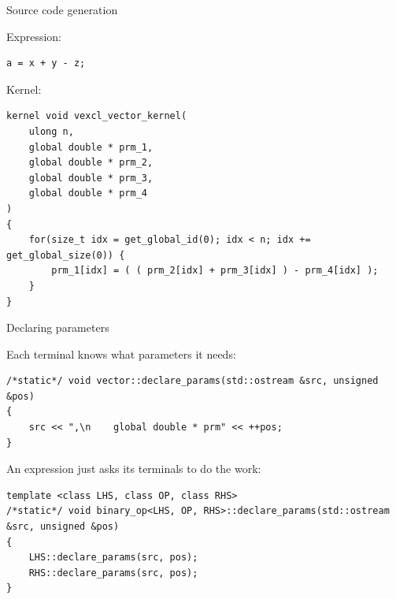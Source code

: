 \documentclass[@BEAMER_OPTIONS@]{beamer}
\begin{document}
\begin{frame}[fragile]{Source code generation}
    \begin{exampleblock}{Expression:}
        \begin{lstlisting}
a = x + y - z;
        \end{lstlisting}
    \end{exampleblock}
    \begin{exampleblock}{Kernel:}
        \begin{lstlisting}
kernel void vexcl_vector_kernel(
    ulong n,
    global double * prm_1,
    global double * prm_2,
    global double * prm_3,
    global double * prm_4
)
{
    for(size_t idx = get_global_id(0); idx < n; idx += get_global_size(0)) {
        prm_1[idx] = ( ( prm_2[idx] + prm_3[idx] ) - prm_4[idx] );
    }
}
        \end{lstlisting}
    \end{exampleblock}
\end{frame}

\begin{frame}[fragile]{Declaring parameters}
    \begin{exampleblock}{Each terminal knows what parameters it needs:}
        \begin{lstlisting}
/*static*/ void vector::declare_params(std::ostream &src, unsigned &pos)
{
    src << ",\n    global double * prm" << ++pos;
}
        \end{lstlisting}
    \end{exampleblock}
    \vspace{0.5\baselineskip}
    \begin{exampleblock}{An expression just asks its terminals to do the work:}
        \begin{lstlisting}[firstnumber=last]
template <class LHS, class OP, class RHS>
/*static*/ void binary_op<LHS, OP, RHS>::declare_params(std::ostream &src, unsigned &pos)
{
    LHS::declare_params(src, pos);
    RHS::declare_params(src, pos);
}
        \end{lstlisting}
    \end{exampleblock}
\end{frame}
\end{document}

